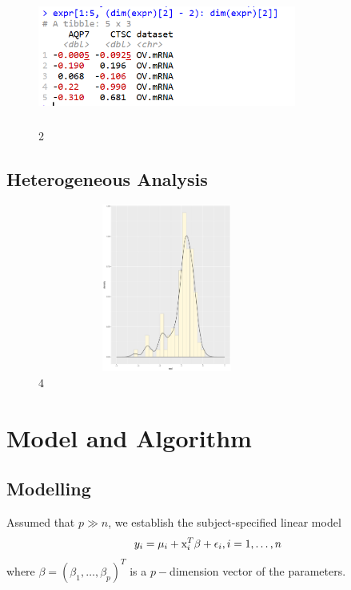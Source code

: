\documentclass[cjk,10pt]{beamer}
\begin{document}
\begin{CJK*}{GBK}{song}
\begin{frame}
    \end{frame}
        \begin{frame}
\begin{figure}[htbp]
\centering
\includegraphics[height=4.5cm, width=8.5cm]{Yxq33as}
\caption{2}
\end{figure}


    \end{frame}

\subsection{Heterogeneous Analysis}
    \begin{frame}

    \begin{figure}[htbp]
\centering
\includegraphics[height=5.5cm, width=8.5cm]{Rplot01}
\caption{4}
\end{figure}

    \end{frame}
    \section{Model and Algorithm}
    \subsection{Modelling}
    \begin{frame}
Assumed that $p\gg n$, we establish the subject-specified linear model
$$y_i=\mu_i+{\rm x}_i^T\beta+\epsilon_i, i=1,\dots,n$$
where $\beta=(\beta_1,\dots,\beta_p)^T$ is a $p-$dimension vector of the parameters.


\end{frame}
\end{CJK*}
\end{document}
